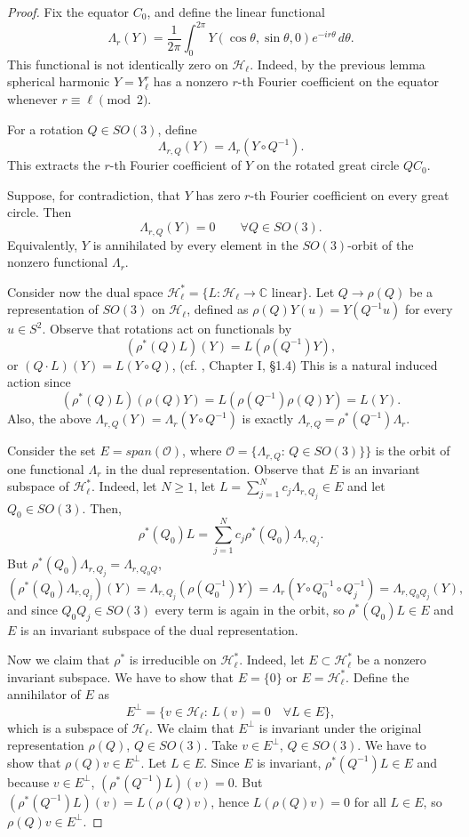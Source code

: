 \documentclass[11pt]{article}
\theoremstyle{definition}
\begin{document}
\begin{proof}
	Fix the equator \(C_0\), and define the linear functional
	\[
	\Lambda_r(Y)
	=
	\frac1{2\pi}\int_0^{2\pi}
	Y(\cos\theta,\sin\theta,0)e^{-ir\theta}\,d\theta.
	\]
	This functional is not identically zero on \(\mathcal H_\ell\). Indeed, by the previous lemma
	spherical harmonic \(Y=Y_\ell^r\) has a nonzero \(r\)-th Fourier coefficient on the equator
	whenever \(r\equiv\ell\pmod2\).
	
	For a rotation \(Q\in SO(3)\), define
	\[
	\Lambda_{r,Q}(Y)=\Lambda_r(Y\circ Q^{-1}).
	\]
	This extracts the \(r\)-th Fourier coefficient of \(Y\) on the rotated great circle
	\(Q C_0\).
	
	Suppose, for contradiction, that \(Y\) has zero \(r\)-th Fourier coefficient on every
	great circle. Then
	\[
	\Lambda_{r,Q}(Y)=0
	\qquad\forall Q\in SO(3).
	\]
	Equivalently, \(Y\) is annihilated by every element in the \(SO(3)\)-orbit of the nonzero
	functional \(\Lambda_r\).
	
	Consider now the dual space \(\mathcal H_\ell^*=\{L:\mathcal H_\ell\to{\mathbb C} \,\,\textrm{linear}\}\). Let $Q\to \rho(Q)$ be a representation of $SO(3)$ on $\mathcal H_\ell$, defined as $\rho(Q)Y(u)=Y(Q^{-1}u)$ for every $u\in S^2$.
	Observe that rotations act on functionals by
	$$
	(\rho^*(Q)L)(Y)=L(\rho(Q^{-1})Y),
	$$
	or  $(Q\cdot L)(Y)=L(Y\circ Q)$, (cf. \cite{V}, Chapter I, \S 1.4) This is  a natural induced action since 
	$$
	(\rho^*(Q)L)(\rho(Q)Y)=L(\rho(Q^{-1})\rho(Q)Y)=L(Y).
	$$
	Also, the above $\Lambda_{r,Q}(Y)=\Lambda_r(Y\circ Q^{-1})$ is  exactly $\Lambda_{r,Q}=\rho^*(Q^{-1})\Lambda_r$.  
	
	Consider the set 
$E=span({\mathcal O})$,
where ${\mathcal O}=\{\Lambda_{r,Q}:\,Q\in SO(3)\}\}$ is the orbit of one functional $\Lambda_r$  in the dual representation. 
Observe  that $E$ is an invariant subspace of \(\mathcal H_\ell^*\). Indeed, let $N\ge 1$, let $L=\sum\limits_{j=1}^Nc_j\Lambda_{r,Q_j}\in E$ and let $Q_0\in SO(3)$. Then,
$$
\rho^*(Q_0)L=\sum\limits_{j=1}^Nc_j\rho^*(Q_0)\Lambda_{r,Q_j}.
$$
	But $\rho^*(Q_0)\Lambda_{r,Q_j}=\Lambda_{r,Q_0Q}$, 
	$$
	(\rho^*(Q_0)\Lambda_{r,Q_j})(Y)=\Lambda_{r,Q_j}(\rho(Q_0^{-1})Y)=\Lambda_r(Y\circ Q_0^{-1}\circ Q_j^{-1})=\Lambda_{r,Q_0Q_j}(Y),
	$$
	and since $Q_0Q_j\in SO(3)$ every term is again in the orbit, so $\rho^*(Q_0)L\in E$ and $E$ is an invariant subspace of the dual representation.
	
	Now we claim that $\rho^*$  is irreducible on $\mathcal H_\ell^*$. 
	Indeed, let $E\subset \mathcal H_\ell^*$ be a nonzero invariant subspace. 
	We have to show that $E=\{0\}$ or $E=\mathcal H_\ell^*$.
	Define the  annihilator of $E$ as
	$$
	E^{\perp}=\{ v\in \mathcal H_\ell:\,L(v)=0\quad\forall L\in E\},
	$$
	which is a subspace of $\mathcal H_\ell$. We claim that $E^{\perp}$ is invariant under the original representation $\rho(Q)$, $Q\in SO(3)$. Take $v\in E^{\perp}$, $Q\in SO(3)$. We have to show that $\rho(Q)v\in E^{\perp}$. Let $L\in E$. Since $E$ is invariant, $\rho^*(Q^{-1})L\in E$ and because $v\in E^{\perp}$, $(\rho^*(Q^{-1})L)(v)=0$. But $(\rho^*(Q^{-1})L)(v)=L(\rho(Q)v)$, hence $L(\rho(Q)v)=0$ for all $L\in E$, so $\rho(Q)v\in E^{\perp}$. 
	

\end{proof}
\end{document}
